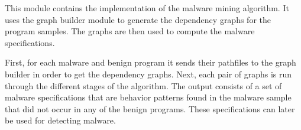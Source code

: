 This module contains the implementation of the malware mining algorithm. It uses the graph builder module to generate the dependency graphs for the program samples. The graphs are then used to compute the malware specifications.

First, for each malware and benign program it sends their pathfiles to the graph builder in order to get the dependency graphs. Next, each pair of graphs is run through the different stages of the algorithm. The output consists of a set of malware specifications that are behavior patterns found in the malware sample that did not occur in any of the benign programs. These specifications can later be used for detecting malware.

